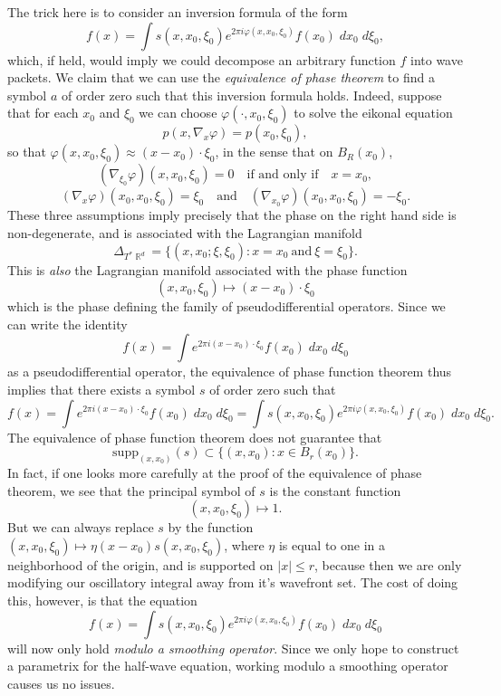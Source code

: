 \documentclass{article}
\theoremstyle{plain}
\theoremstyle{remark}
\theoremstyle{definition}
\DeclareMathOperator{\RR}{\mathbb{R}}
\begin{document}
The trick here is to consider an inversion formula of the form
%
\[ f(x) = \int s(x,x_0,\xi_0) e^{2 \pi i \varphi(x,x_0,\xi_0)} f(x_0)\; dx_0\; d\xi_0, \]
%
which, if held, would imply we could decompose an arbitrary function $f$ into wave packets. We claim that we can use the \emph{equivalence of phase theorem} to find a symbol $a$ of order zero such that this inversion formula holds. Indeed, suppose that for each $x_0$ and $\xi_0$ we can choose $\varphi(\cdot,x_0,\xi_0)$ to solve the eikonal equation
%
\[ p(x,\nabla_x \varphi) = p(x_0,\xi_0), \]
%
so that $\varphi(x,x_0,\xi_0) \approx (x - x_0) \cdot \xi_0$, in the sense that on $B_R(x_0)$,
%
\[ (\nabla_{\xi_0} \varphi)(x,x_0,\xi_0) = 0 \quad\text{if and only if}\quad x = x_0, \]
%
\[ (\nabla_x \varphi)(x_0,x_0,\xi_0) = \xi_0 \quad\text{and}\quad (\nabla_{x_0} \varphi)(x_0,x_0,\xi_0) = - \xi_0. \]
%
These three assumptions imply precisely that the phase on the right hand side is non-degenerate, and is associated with the Lagrangian manifold
%
\[ \Delta_{T^* \RR^d} = \Big\{ (x,x_0;\xi,\xi_0): x = x_0\ \text{and}\ \xi = \xi_0 \Big\}. \]
%
This is \emph{also} the Lagrangian manifold associated with the phase function
%
\[ (x,x_0,\xi_0) \mapsto (x - x_0) \cdot \xi_0 \]
%
which is the phase defining the family of pseudodifferential operators. Since we can write the identity
%
\[ f(x) = \int e^{2 \pi i (x - x_0) \cdot \xi_0} f(x_0)\; dx_0\; d\xi_0 \]
%
as a pseudodifferential operator, the equivalence of phase function theorem thus implies that there exists a symbol $s$ of order zero such that
%
\[ f(x) = \int e^{2 \pi i (x - x_0) \cdot \xi_0} f(x_0)\; dx_0\; d\xi_0 = \int s(x,x_0,\xi_0) e^{2 \pi i \varphi(x,x_0,\xi_0)} f(x_0)\; dx_0\; d\xi_0. \]
%
The equivalence of phase function theorem does not guarantee that
%
\[ \text{supp}_{(x,x_0)}(s) \subset \{ (x,x_0) : x \in B_r(x_0) \}. \]
%
In fact, if one looks more carefully at the proof of the equivalence of phase theorem, we see that the principal symbol of $s$ is the constant function
%
\[ (x,x_0,\xi_0) \mapsto 1. \]
%
But we can always replace $s$ by the function $(x,x_0,\xi_0) \mapsto \eta(x - x_0) s(x,x_0,\xi_0)$, where $\eta$ is equal to one in a neighborhood of the origin, and is supported on $|x| \leq r$, because then we are only modifying our oscillatory integral away from it's wavefront set. The cost of doing this, however, is that the equation
%
\[ f(x) = \int s(x,x_0,\xi_0) e^{2 \pi i \varphi(x,x_0,\xi_0)} f(x_0)\; dx_0\; d\xi_0 \]
%
will now only hold \emph{modulo a smoothing operator}. Since we only hope to construct a parametrix for the half-wave equation, working modulo a smoothing operator causes us no issues.
\end{document}
